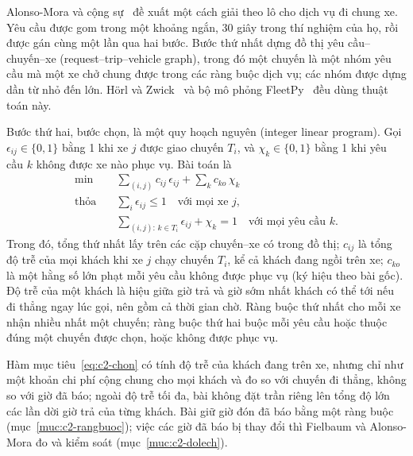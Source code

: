 Alonso-Mora và cộng sự~\cite{alonsomora2017} đề xuất một cách giải theo lô cho dịch vụ đi chung xe. Yêu cầu được gom
trong một khoảng ngắn, 30 giây trong thí nghiệm của họ, rồi được gán cùng một lần qua hai bước. Bước thứ nhất dựng
đồ thị yêu cầu--chuyến--xe (request--trip--vehicle graph), trong đó một chuyến là một nhóm yêu cầu mà một xe chở chung
được trong các ràng buộc dịch vụ; các nhóm được dựng dần từ nhỏ đến lớn. Hörl và Zwick~\cite{horl2022} và bộ mô
phỏng FleetPy~\cite{engelhardt2026} đều dùng thuật toán này.

Bước thứ hai, bước chọn, là một quy hoạch nguyên (integer linear program). Gọi $\epsilon_{ij} \in \{0, 1\}$ bằng 1
khi xe $j$ được giao chuyến $T_i$, và $\chi_k \in \{0, 1\}$ bằng 1 khi yêu cầu $k$ không được xe nào phục vụ. Bài
toán là
\begin{equation}
\begin{aligned}
\min\quad & \sum_{(i,j)} c_{ij}\,\epsilon_{ij} + \sum_{k} c_{ko}\,\chi_k\\
\text{thỏa}\quad & \sum_{i} \epsilon_{ij} \le 1 \quad \text{với mọi xe } j,\\
& \sum_{(i,j):\, k \in T_i} \epsilon_{ij} + \chi_k = 1 \quad \text{với mọi yêu cầu } k .
\end{aligned}
\label{eq:c2-chon}
\end{equation}
Trong đó, tổng thứ nhất lấy trên các cặp chuyến--xe có trong đồ thị; $c_{ij}$ là tổng độ trễ của mọi khách khi xe $j$
chạy chuyến $T_i$, kể cả khách đang ngồi trên xe; $c_{ko}$ là một hằng số lớn phạt mỗi yêu cầu không được phục vụ (ký
hiệu theo bài gốc). Độ trễ của một khách là hiệu giữa giờ trả và giờ sớm nhất khách có thể tới nếu đi thẳng ngay lúc
gọi, nên gồm cả thời gian chờ. Ràng buộc thứ nhất cho mỗi xe nhận nhiều nhất một chuyến; ràng buộc thứ hai buộc mỗi
yêu cầu hoặc thuộc đúng một chuyến được chọn, hoặc không được phục vụ.

Hàm mục tiêu~\eqref{eq:c2-chon} có tính độ trễ của khách đang trên xe, nhưng chỉ như một khoản chi phí cộng chung cho
mọi khách và đo so với chuyến đi thẳng, không so với giờ đã báo; ngoài độ trễ tối đa, bài không đặt trần riêng lên
tổng độ lớn các lần dời giờ trả của từng khách. Bài giữ giờ đón đã báo bằng một ràng buộc (mục~\ref{muc:c2-rangbuoc});
việc các giờ đã báo bị thay đổi thì Fielbaum và Alonso-Mora đo và kiểm soát (mục~\ref{muc:c2-dolech}).

